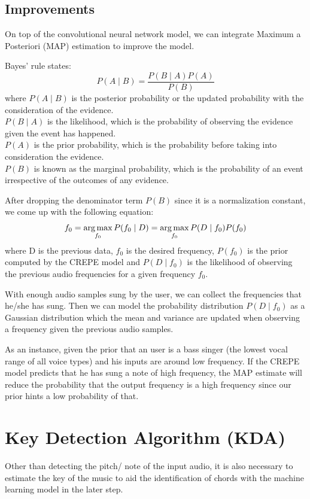 \subsection{Improvements}

On top of the convolutional neural network model, we can integrate Maximum a Posteriori (MAP) estimation to improve the model.

Bayes' rule states: 
\[P(A\mid B)=\frac {P(B\mid A)P(A)}{P(B)}\]
where $P(A\mid B)$ is the posterior probability or the updated probability with the consideration of the evidence.\\
$P(B\mid A)$ is the likelihood, which is the probability of observing the evidence given the event has happened.\\
$P(A)$ is the prior probability, which is the probability before taking into consideration the evidence.\\
$P(B)$ is known as the marginal probability, which is the probability of an event irrespective of the outcomes of any evidence.

After dropping the denominator term $P(B)$ since it is a normalization constant, we come up with the following equation:
\[f_0 = \operatorname*{arg\,max}_{f_0} P({f_0}\mid D) = \operatorname*{arg\,max}_{f_0} P(D\mid {f_0}) P({f_0})\]
where D is the previous data, $f_0$ is the desired frequency, $P({f_0})$ is the prior computed by the CREPE model and $P(D\mid {f_0})$ is the likelihood
of observing the previous audio frequencies for a given frequency $f_0$.

With enough audio samples sung by the user, we can collect the frequencies that he/she has sung. Then we can model the probability 
distribution $P(D\mid {f_0})$ as a Gaussian distribution which the mean and variance are updated when observing a frequency given the previous audio samples. 

As an instance, given the prior that an user is a bass singer (the lowest vocal range of all voice types) and his inputs are around low frequency. 
If the CREPE model predicts that he has sung a note of high frequency, the MAP estimate will reduce the probability that the output frequency is a high
frequency since our prior hints a low probability of that.


\section{Key Detection Algorithm (KDA)}
\label{sec:KDA}
Other than detecting the pitch/ note of the input audio, it is also necessary to estimate the key of the music to aid the identification
of chords with the machine learning model in the later step.

